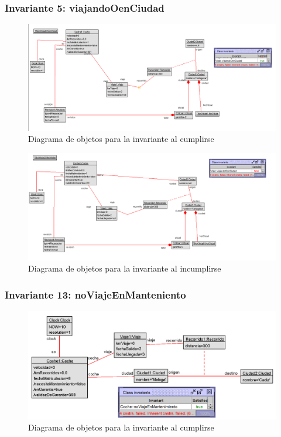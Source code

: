 \documentclass[12pt.a4paper]{article}
\begin{document}
\subsubsection{Invariante 5: viajandoOenCiudad}
\vspace{1.0 cm}
\begin{figure}[H]
     \includegraphics[width=1\linewidth]{Soils/dinamico_inv5_true.png}
     \caption{Diagrama de objetos para la invariante al cumplirse}
\end{figure}

\begin{figure}[H]
     \includegraphics[width=1\linewidth]{Soils/dinamico_inv5_false.png}
     \caption{Diagrama de objetos para la invariante al incumplirse}
\end{figure}

\subsubsection{Invariante 13: noViajeEnManteniento}
\vspace{1.0 cm}
\begin{figure}[H]
     \includegraphics[width=0.80\linewidth]{Soils/dinamico_inv13_true.png}
     \caption{Diagrama de objetos para la invariante al cumplirse}
\end{figure}
\end{document}
